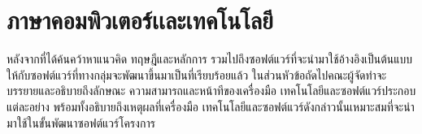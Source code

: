 \documentclass[12pt,one side,openright,a4paper]{cpe-thesis-th}
\newcommand{\thaijustify}[1]{%
  \par\hspace{30pt}\justifying
  #1
}
\begin{document}

\section{ภาษาคอมพิวเตอร์เเละเทคโนโลยี}
\thaijustify{
  หลังจากที่ได้ค้นคว้าหาแนวคิด ทฤษฎีและหลักการ รวมไปถึงซอฟต์แวร์ที่จะนำมาใช้อ้างอิงเป็นต้นแบบให้กับซอฟต์แวร์ที่ทางกลุ่มจะพัฒนาขึ้นมาเป็นที่เรียบร้อยแล้ว ในส่วนหัวข้อถัดไปคณะผู้จัดทำจะบรรยายและอธิบายถึงลักษณะ ความสามารถและหน้าทีของเครื่องมือ เทคโนโลยีและซอฟต์แวร์ประกอบแต่ละอย่าง พร้อมทั้งอธิบายถึงเหตุผลที่เครื่องมือ เทคโนโลยีและซอฟต์แวร์ดังกล่าวนั้นเหมาะสมที่จะนำมาใช้ในขั้นพัฒนาซอฟต์แวร์โครงการ
}
\end{document}

